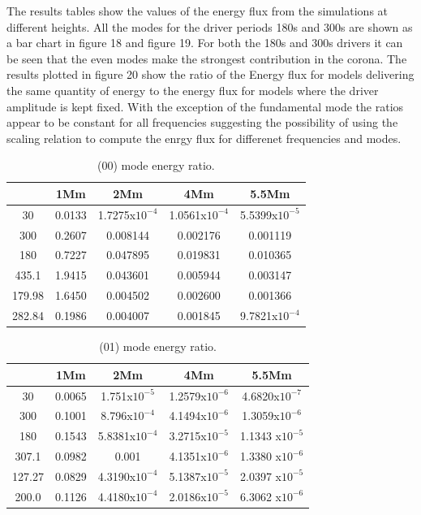 \documentclass[final,1p]{elsarticle}
\begin{document}
The results tables show the values of the energy flux from the simulations at different heights. All the modes for the driver periods 180s and 300s are shown as a bar chart in figure 18 and figure 19. For both the 180s and 300s drivers it can be seen that the even modes make the strongest contribution in the corona. The results plotted in figure 20 show the ratio of the Energy flux for models delivering the same quantity of energy to the energy flux for models where the driver amplitude is kept fixed. With the exception of the fundamental mode the ratios appear to be constant for all frequencies suggesting the possibility of using the scaling relation to compute the enrgy flux for differenet frequencies and modes.  



\begin{table}
\centering
\begin{tabular}{c c c c c }
\hline
   &  1Mm & 2Mm & 4Mm & 5.5Mm \\
\hline
30 &  0.0133 & 1.7275x$10^{-4}$ & 1.0561x$10^{-4}$ & 5.5399x$10^{-5}$ \\
\hline
300 & 0.2607 & 0.008144 & 0.002176 &  0.001119 \\
\hline
180 & 0.7227 & 0.047895 & 0.019831 &  0.010365 \\
\hline
435.1 & 1.9415 & 0.043601 & 0.005944 & 0.003147  \\
\hline
179.98 & 1.6450 & 0.004502 & 0.002600&  0.001366 \\ 
\hline
282.84 & 0.1986 & 0.004007 & 0.001845 &  9.7821x$10^{-4}$ \\
\hline
\end{tabular} 
\caption{ (00) mode energy ratio.}
\end{table}




\begin{table}
\centering
\begin{tabular}{c c c c c }
\hline
   &  1Mm & 2Mm & 4Mm & 5.5Mm \\
\hline
30 &  0.0065 & 1.751x$10^{-5}$ &  1.2579x$10^{-6}$ & 4.6820x$10^{-7}$ \\
\hline
300 & 0.1001 & 8.796x$10^{-4}$ &  4.1494x$10^{-6}$ &  1.3059x$10^{-6}$ \\
\hline
180 & 0.1543 &  5.8381x$10^{-4}$ &  3.2715x$10^{-5}$ &  1.1343 x$10^{-5}$ \\
\hline
307.1 & 0.0982 & 0.001 & 4.1351x$10^{-6}$ & 1.3380 x$10^{-6}$  \\
\hline
127.27 & 0.0829 &  4.3190x$10^{-4}$ &  5.1387x$10^{-5}$ & 2.0397 x$10^{-5}$ \\ 
\hline
200.0 & 0.1126 &  4.4180x$10^{-4}$ &  2.0186x$10^{-5}$ & 6.3062 x$10^{-6}$ \\
\hline
\end{tabular} 
\caption{ (01) mode energy ratio.}
\end{table}
\end{document}
